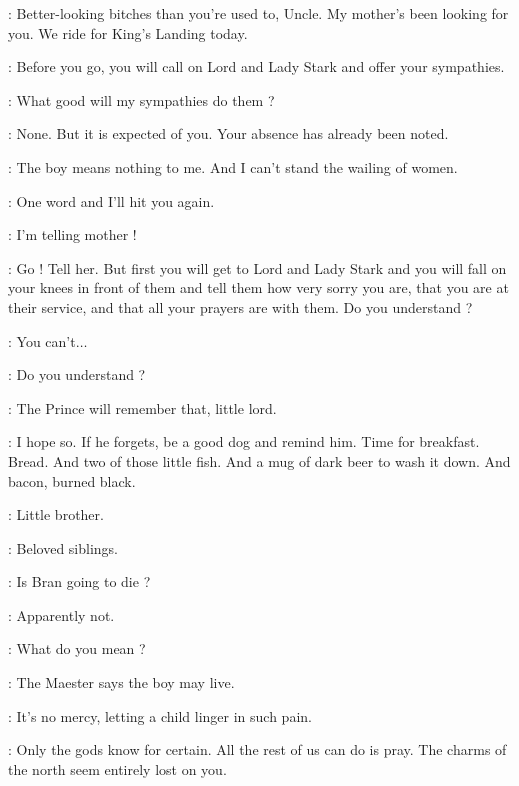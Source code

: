 \JOFFREY: Better-looking bitches than you're used to, Uncle. My mother's been looking for you. We ride for King's Landing today. 

\TYRION: Before you go, you will call on Lord and Lady Stark and offer your sympathies. 

\JOFFREY: What good will my sympathies do them ? 

\TYRION: None. But it is expected of you. Your absence has already been noted. 

\JOFFREY: The boy means nothing to me. And I can't stand the wailing of women. 


\TYRION: One word and I'll hit you again. 

\JOFFREY: I'm telling mother ! 


\TYRION: Go ! Tell her. But first you will get to Lord and Lady Stark and you will fall on your knees in front of them and tell them how very sorry you are, that you are at their service, and that all your prayers are with them. Do you understand ? 

\JOFFREY: You can't$\ldots$ 

\TYRION: Do you understand ? 


\HOUND: The Prince will remember that, little lord. 

\TYRION: I hope so. If he forgets, be a good dog and remind him. Time for breakfast. Bread. And two of those little fish. And a mug of dark beer to wash it down. And bacon, burned black. 

\scene



\JAIME: Little brother. 

\TYRION: Beloved siblings. 

\MYRCELLA: Is Bran going to die ? 

\TYRION: Apparently not. 

\CERSEI: What do you mean ? 

\TYRION: The Maester says the boy may live. 

\CERSEI: It's no mercy, letting a child linger in such pain. 

\TYRION: Only the gods know for certain. All the rest of us can do is pray. The charms of the north seem entirely lost on you. 

